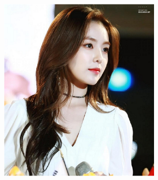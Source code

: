 \documentclass[11pt]{article}
\begin{document}
\begin{center}
\includegraphics[width=0.6\textwidth, page={4}]{RedVelvet}
\end{center}
\end{document}
